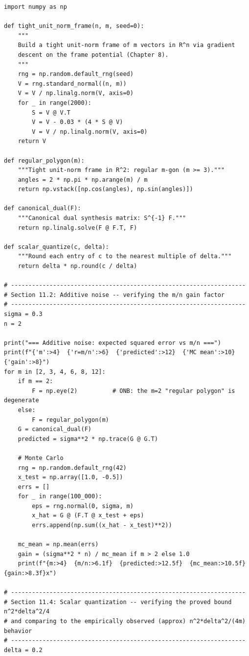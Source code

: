 \begin{lstlisting}[caption={Noise and quantization simulations for tight frames}]
import numpy as np

def tight_unit_norm_frame(n, m, seed=0):
    """
    Build a tight unit-norm frame of m vectors in R^n via gradient
    descent on the frame potential (Chapter 8).
    """
    rng = np.random.default_rng(seed)
    V = rng.standard_normal((n, m))
    V = V / np.linalg.norm(V, axis=0)
    for _ in range(2000):
        S = V @ V.T
        V = V - 0.03 * (4 * S @ V)
        V = V / np.linalg.norm(V, axis=0)
    return V

def regular_polygon(m):
    """Tight unit-norm frame in R^2: regular m-gon (m >= 3)."""
    angles = 2 * np.pi * np.arange(m) / m
    return np.vstack([np.cos(angles), np.sin(angles)])

def canonical_dual(F):
    """Canonical dual synthesis matrix: S^{-1} F."""
    return np.linalg.solve(F @ F.T, F)

def scalar_quantize(c, delta):
    """Round each entry of c to the nearest multiple of delta."""
    return delta * np.round(c / delta)

# -------------------------------------------------------------------
# Section 11.2: Additive noise -- verifying the m/n gain factor
# -------------------------------------------------------------------
sigma = 0.3
n = 2

print("=== Additive noise: expected squared error vs m/n ===")
print(f"{'m':>4}  {'r=m/n':>6}  {'predicted':>12}  {'MC mean':>10}  {'gain':>8}")
for m in [2, 3, 4, 6, 8, 12]:
    if m == 2:
        F = np.eye(2)          # ONB: the m=2 "regular polygon" is degenerate
    else:
        F = regular_polygon(m)
    G = canonical_dual(F)
    predicted = sigma**2 * np.trace(G @ G.T)

    # Monte Carlo
    rng = np.random.default_rng(42)
    x_test = np.array([1.0, -0.5])
    errs = []
    for _ in range(100_000):
        eps = rng.normal(0, sigma, m)
        x_hat = G @ (F.T @ x_test + eps)
        errs.append(np.sum((x_hat - x_test)**2))

    mc_mean = np.mean(errs)
    gain = (sigma**2 * n) / mc_mean if m > 2 else 1.0
    print(f"{m:>4}  {m/n:>6.1f}  {predicted:>12.5f}  {mc_mean:>10.5f}  {gain:>8.3f}x")

# -------------------------------------------------------------------
# Section 11.4: Scalar quantization -- verifying the proved bound n^2*delta^2/4
# and comparing to the empirically observed (approx) n^2*delta^2/(4m) behavior
# -------------------------------------------------------------------
delta = 0.2


\end{lstlisting}

